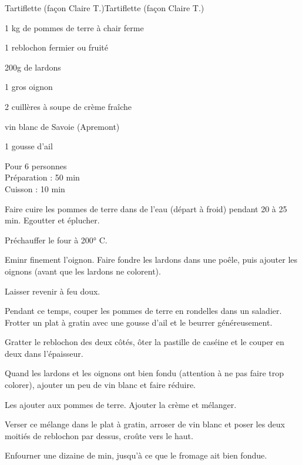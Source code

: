 \begin{recette}{Tartiflette (façon Claire T.)}{Tartiflette (façon Claire T.)}

\begin{ingredients}
1 kg de pommes de terre à chair ferme\par
1 reblochon fermier ou fruité\par
200g de lardons\par
1 gros oignon\par
2 cuillères à soupe de crème fraîche\par
vin blanc de Savoie (Apremont)\par
1 gousse d'ail\par
\end{ingredients}

\begin{infos}
Pour 6 personnes\\
Préparation : 50 min\\
Cuisson : 10 min\\
\end{infos}

\begin{etapes}
\item Faire cuire les pommes de terre dans de l'eau (départ à froid) pendant 20 à 25 min. Egoutter et éplucher.
\item Préchauffer le four à 200° C.
\item Eminr finement l'oignon. Faire fondre les lardons dans une poêle, puis ajouter les oignons (avant que les lardons ne colorent).
\item Laisser revenir à feu doux.
\item Pendant ce temps, couper les pommes de terre en rondelles dans un saladier. Frotter un plat à gratin avec une gousse d'ail et le beurrer généreusement.
\item Gratter le reblochon des deux côtés, ôter la pastille de caséine et le couper en deux dans l'épaisseur.
\item Quand les lardons et les oignons ont bien fondu (attention à ne pas faire trop colorer), ajouter un peu de vin blanc et faire réduire.
\item Les ajouter aux pommes de terre. Ajouter la crème et mélanger.
\item Verser ce mélange dans le plat à gratin, arroser de vin blanc et poser les deux moitiés de reblochon par dessus, croûte vers le haut.
\item Enfourner une dizaine de min, jusqu'à ce que le fromage ait bien fondue.
\end{etapes}

\end{recette}